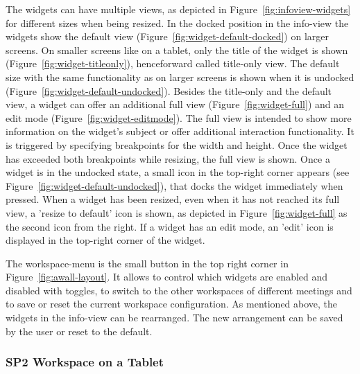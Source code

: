 \documentclass{sigchi}
\begin{document}
The widgets can have multiple views, as depicted in Figure~\ref{fig:infoview-widgets} for different sizes when being resized.
In the docked position in the info-view the widgets show the default view (Figure~\ref{fig:widget-default-docked}) on larger screens. 
On smaller screens like on a tablet, only the title of the widget is shown (Figure~\ref{fig:widget-titleonly}), henceforward called title-only view.
The default size with the same functionality as on larger screens is shown when it is undocked (Figure~\ref{fig:widget-default-undocked}).
Besides the title-only and the default view, a widget can offer an additional full view (Figure~\ref{fig:widget-full}) and an edit mode (Figure~\ref{fig:widget-editmode}).
The full view is intended to show more information on the widget's subject or offer additional interaction functionality.
It is triggered by specifying breakpoints for the width and height.
Once the widget has exceeded both breakpoints while resizing, the full view is shown.
Once a widget is in the undocked state, a small icon in the top-right corner appears (see Figure~\ref{fig:widget-default-undocked}), that docks the widget immediately when pressed.
When a widget has been resized, even when it has not reached its full view, a 'resize to default' icon is shown, as depicted in Figure~\ref{fig:widget-full} as the second icon from the right.
If a widget has an edit mode, an 'edit' icon is displayed in the top-right corner of the widget.

The workspace-menu is the small button in the top right corner in Figure~\ref{fig:awall-layout}.
It allows to control which widgets are enabled and disabled with toggles, to switch to the other workspaces of different meetings and to save or reset the current workspace configuration.
As mentioned above, the widgets in the info-view can be rearranged.
The new arrangement can be saved by the user or reset to the default.


\subsubsection{SP2 Workspace on a Tablet}
\end{document}
